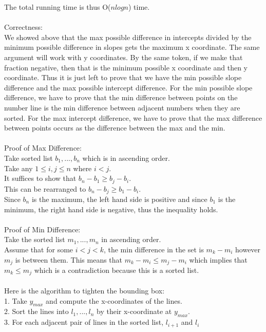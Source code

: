 \documentclass[11pt,psfig]{article}
\begin{document}
The total running time is thus O($n log n$) time. \\
\\
Correctness:\\
We showed above that the max possible difference in intercepts divided by the minimum possible difference in slopes gets the maximum x coordinate. The same argument will work with y coordinates. By the same token, if we make that fraction negative, then that is the minimum possible x coordinate and then y coordinate. Thus it is just left to prove that we have the min possible slope difference and the max possible intercept difference. For the min possible slope difference, we have to prove that the min difference between points on the number line is the min difference between adjacent numbers when they are sorted. For the max intercept difference, we have to prove that the max difference between points occurs as the difference between the max and the min. \\
\\
Proof of Max Difference: \\
Take sorted list $b_1,...,b_n$ which is in ascending order. \\Take any $1 \leq i,j \leq n$ where $i < j$. \\It suffices to show that $b_n - b_1 \geq b_j - b_i$. \\
This can be rearranged to $b_n-b_j \geq b_1-b_i$. \\
Since $b_n$ is the maximum, the left hand side is positive and since $b_1$ is the minimum, the right hand side is negative, thus the inequality holds. \\
\\
Proof of Min Difference: \\
Take the sorted list $m_1,...,m_n$ in ascending order.\\
Assume that for some $i < j < k$, the min difference in the set is $m_k-m_i$ however $m_j$ is between them. This means that $m_k-m_i \leq m_j-m_i$ which implies that $m_k \leq m_j$ which is a contradiction because this is a sorted list. \\
\\
Here is the algorithm to tighten the bounding box:\\
1. Take $y_{max}$ and compute the x-coordinates of the lines. \\
2. Sort the lines into $l_1,...,l_n$ by their x-coordinate at $y_{max}$. \\
3. For each adjacent pair of lines in the sorted list, $l_{i+1}$ and $l_i$\\
\end{document}
